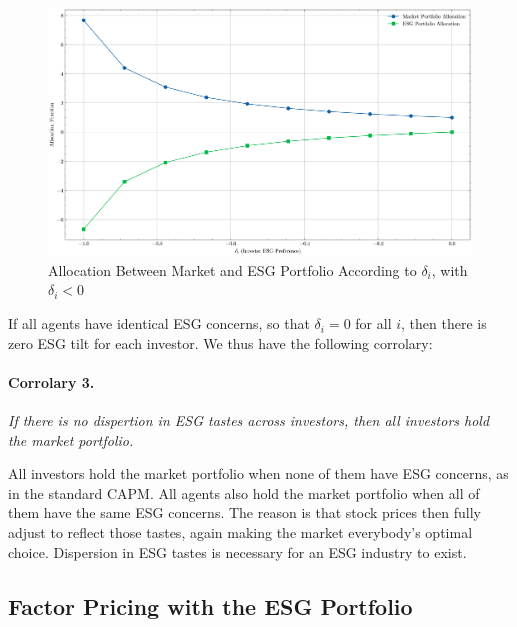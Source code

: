 \begin{figure}
    \centering
    \includegraphics[width=1\textwidth]{../images/chapter01/allocation_fractions_vs_delta_i_short.png}
    \caption{Allocation Between Market and ESG Portfolio According to $\delta_i$,
    with $\delta_i < 0$}
    \label{fig:portfolio_tilts_short}
\end{figure}

If all agents have identical ESG concerns,
so that $\delta_i = 0$ for all $i$, 
then there is zero ESG tilt for each investor.
We thus have the following corrolary:

\paragraph{Corrolary 3.} \textit{If there is no 
dispertion in ESG tastes across investors, 
then all investors hold the market portfolio.}

All investors hold the market portfolio 
when none of them have ESG concerns, as in the 
standard CAPM. All agents also hold the market 
portfolio when all of them have the same ESG concerns.
The reason is that stock prices then fully adjust 
to reflect those tastes, again making the 
market everybody's optimal choice. Dispersion in 
ESG tastes is necessary for an ESG industry to exist.


\subsection{Factor Pricing with the ESG Portfolio}